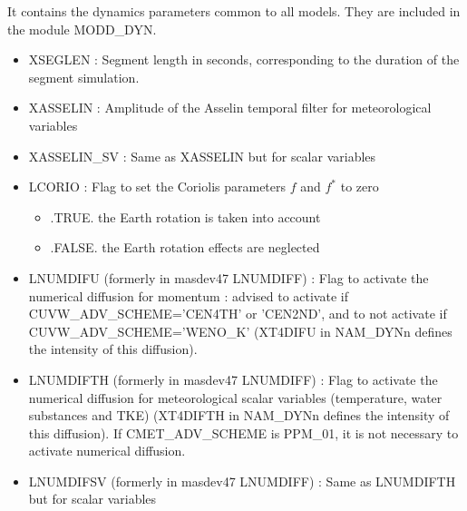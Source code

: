 It contains the dynamics parameters common to all models. They
are included in the module MODD\_DYN. 
\begin{itemize}

\item
XSEGLEN : Segment length  in seconds, corresponding to the duration of the segment simulation.


\item
XASSELIN : Amplitude of the Asselin temporal  filter for meteorological variables

\item
XASSELIN\_SV : Same as XASSELIN but for scalar variables


\item
LCORIO : Flag to set the Coriolis parameters $f$ and $f^*$ to zero

\begin{itemize}
\item .TRUE.  the Earth rotation is taken into account
\item  .FALSE. the Earth rotation effects are neglected  
\end{itemize} 

\item
LNUMDIFU (formerly in masdev47 LNUMDIFF) :  Flag to activate the numerical diffusion for momentum : advised to activate if CUVW\_ADV\_SCHEME='CEN4TH' or 'CEN2ND', and to not activate if CUVW\_ADV\_SCHEME='WENO\_K'
(XT4DIFU in NAM\_DYNn defines the intensity of this diffusion).

\item
LNUMDIFTH (formerly in masdev47 LNUMDIFF)  :  Flag to activate the numerical diffusion for meteorological scalar variables (temperature, water substances and TKE)
(XT4DIFTH in NAM\_DYNn defines the intensity of this diffusion). If CMET\_ADV\_SCHEME is PPM\_01, it is not necessary to activate numerical diffusion.

\item
LNUMDIFSV (formerly in masdev47 LNUMDIFF)  :  Same as LNUMDIFTH but for scalar variables



\end{itemize}

